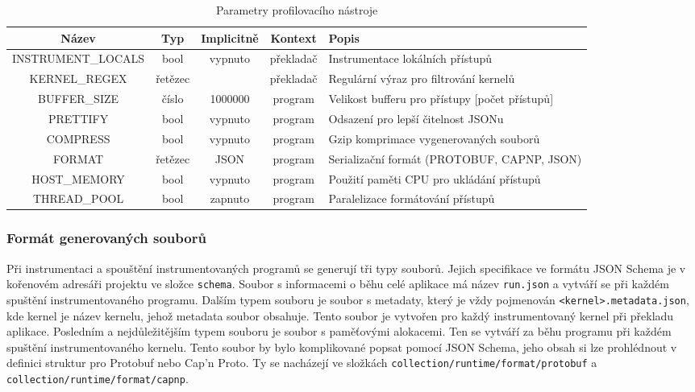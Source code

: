\begin{table}[h]
\centering
\bgroup
\def\arraystretch{1.2}
\begin{tabularx}{\textwidth}{|c|c|c|c|Y|}
\hline
\textbf{Název} & \textbf{Typ} & \textbf{Implicitně} & \textbf{Kontext} & \textbf{Popis} \\
\hline
INSTRUMENT\_LOCALS & bool & vypnuto & překladač & Instrumentace lokálních přístupů \\
\hline
KERNEL\_REGEX & řetězec & & překladač & Regulární výraz pro filtrování kernelů \\
\hline
BUFFER\_SIZE & číslo & 1000000 & program & Velikost bufferu pro přístupy [počet přístupů] \\
\hline
PRETTIFY & bool & vypnuto & program & Odsazení pro lepší čitelnost JSONu \\
\hline
COMPRESS & bool & vypnuto & program & Gzip komprimace vygenerovaných souborů \\
\hline
FORMAT & řetězec & JSON & program & Serializační formát (PROTOBUF, CAPNP, JSON) \\
\hline
HOST\_MEMORY & bool & vypnuto & program & Použití paměti CPU pro ukládání přístupů \\
\hline
THREAD\_POOL & bool & zapnuto & program & Paralelizace formátování přístupů \\
\hline
\end{tabularx}
\egroup
\caption{Parametry profilovacího nástroje}
\label{tab:parameters}
\end{table}

\subsubsection{Formát generovaných souborů}
Při instrumentaci a spouštění instrumentovaných programů se generují tři typy souborů. Jejich specifikace ve formátu JSON Schema je v kořenovém adresáři projektu ve složce \texttt{schema}. Soubor s informacemi o běhu celé aplikace má název \texttt{run.json} a vytváří se při každém spuštění instrumentovaného programu. Dalším typem souboru je soubor s metadaty, který je vždy pojmenován \texttt{<kernel>.metadata.json}, kde kernel je název kernelu, jehož metadata soubor obsahuje. Tento soubor je vytvořen pro každý instrumentovaný kernel při překladu aplikace. Posledním a nejdůležitějším typem souboru je soubor s paměťovými alokacemi. Ten se vytváří za běhu programu při každém spuštění instrumentovaného kernelu. Tento soubor by bylo komplikované popsat pomocí JSON Schema, jeho obsah si lze prohlédnout v definici struktur pro Protobuf nebo Cap'n Proto. Ty se nacházejí ve složkách \texttt{collection/runtime/format/protobuf} a \texttt{collection/runtime/format/capnp}.


